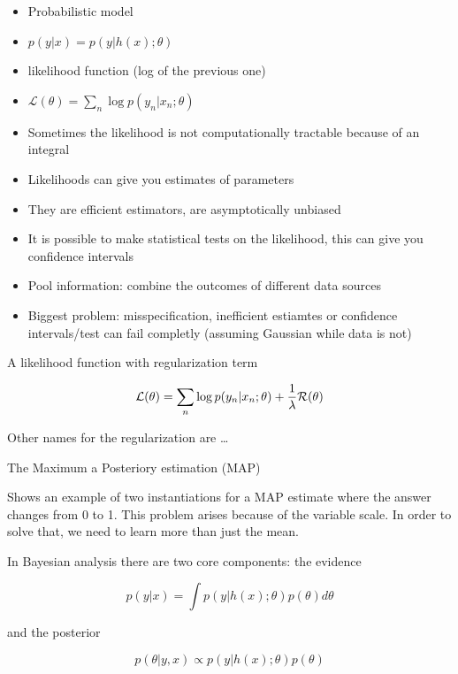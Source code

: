 \documentclass[b5paper]{report}
\begin{document}
\begin{itemize}
  \item Probabilistic model
  \item $p(y|x) = p(y|h(x); \theta)$
  \item likelihood function (log of the previous one)
  \item $\mathcal{L}(\theta) = \sum_n \log p(y_n|x_n; \theta)$
  \item Sometimes the likelihood is not computationally tractable because of an
    integral
  \item Likelihoods can give you estimates of parameters
  \item They are efficient estimators, are asymptotically unbiased
  \item It is possible to make statistical tests on the likelihood, this can
    give you confidence intervals
  \item Pool information: combine the outcomes of different data sources
  \item Biggest problem: misspecification, inefficient estiamtes or confidence
    intervals/test can fail completly (assuming Gaussian while data is not)
\end{itemize}

A likelihood function with regularization term

\begin{equation}
  \operatorname*{\mathcal{L}}(\theta) = \sum_n \log p(y_n|x_n; \theta) + \frac{1}{\lambda}
\mathcal{R}(\theta)
\end{equation}

Other names for the regularization are \ldots

The Maximum a Posteriory estimation (MAP)

Shows an example of two instantiations for a MAP estimate where the answer
changes from 0 to 1. This problem arises because of the variable scale. In
order to solve that, we need to learn more than just the mean.

In Bayesian analysis there are two core components: the evidence

\begin{equation}
  p(y|x) = \int p(y|h(x); \theta)p(\theta)d\theta
\end{equation}

and the posterior

\begin{equation}
  p(\theta | y,x) \propto p(y|h(x); \theta)p(\theta)
\end{equation}
\end{document}
